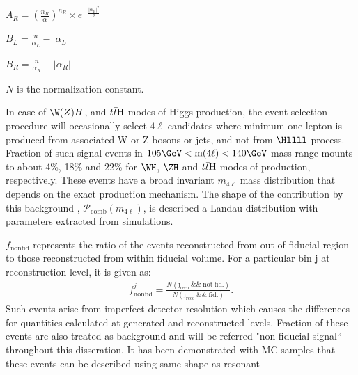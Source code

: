 \begin{center}
$A_{R} = (\frac{n_{R}}{\alpha})^{n_{R}} \times e^{-\frac{|\alpha_{R}|^{2}}{2}}$
\end{center}

\begin{center}
$B_{L} = \frac{n}{\alpha_{L}} - |\alpha_{L}|$
\end{center}

\begin{center}
$B_{R} = \frac{n}{\alpha_{R}} - |\alpha_{R}|$
\end{center}

\begin{center}
$N$ is the normalization constant.
\end{center}




\par
In case of $\W(Z)H$, %
and $t\bar{t}{\rm H}$ modes of Higgs production, the event selection procedure will occasionally select $4\ell$ candidates where minimum one lepton is produced from associated W or Z bosons or jets, and not from $\Hllll$ process.
Fraction of such signal events in $105 \GeV < \mathrm{m}(4\ell) < 140 \GeV$ mass range mounts to about 4\%, 18\% and 22\% for $\WH$, $\ZH$ and $t\bar{t}{\rm H}$ modes of production, respectively. These events have a broad invariant $m_{4\ell}$ mass distribution
that depends on the exact production mechanism. The shape of the contribution by this background , $\mathcal{P}_{\mathrm{comb}}(m_{4\ell})$, is described
a Landau distribution with parameters extracted from simulations. 
\par 
$f_{\mathrm{nonfid}}$ represents the ratio of the events reconstructed from out of fiducial region to those reconstructed from within fiducial volume.
For a particular bin j at reconstruction level, it is given as:
\begin{eqnarray}
f^{j}_{\mathrm{nonfid}} = \frac{N(\mathrm{j_{reco}} ~\&\&~ \mathrm{not~fid.})}{N(\mathrm{j_{reco}} ~\&\&~ \mathrm{fid.})}.
\end{eqnarray}
Such events arise from imperfect detector resolution which causes the differences for quantities calculated at generated and reconstructed levels.
Fraction of these events are also treated as background and will be referred 
"non-fiducial signal`` throughout  this disseration. It has been demonstrated with MC samples that these events can be described using same shape as resonant
